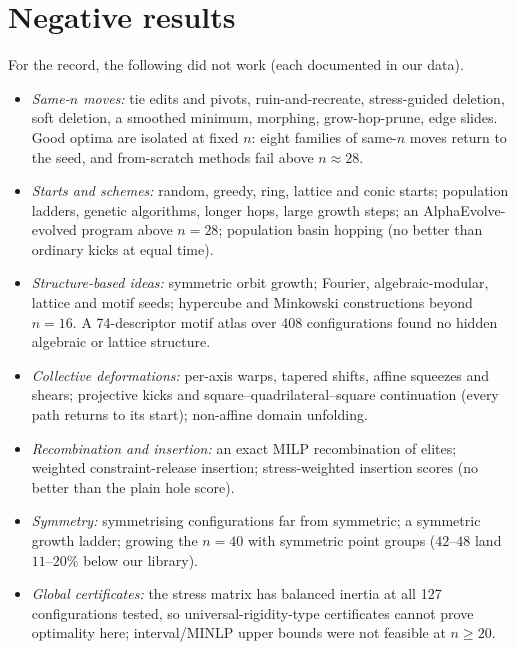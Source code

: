 \documentclass[11pt]{amsart}
\theoremstyle{definition}
\begin{document}
\section{Negative results}\label{sec:negative}
For the record, the following did not work (each documented in our data).
\begin{itemize}
\item \emph{Same-$n$ moves:} tie edits and pivots, ruin-and-recreate, stress-guided deletion, soft deletion, a smoothed minimum, morphing, grow-hop-prune, edge slides. Good optima are isolated at fixed $n$: eight families of same-$n$ moves return to the seed, and from-scratch methods fail above $n \approx 28$. %
\item \emph{Starts and schemes:} random, greedy, ring, lattice and conic starts; population ladders, genetic algorithms, longer hops, large growth steps; an AlphaEvolve-evolved program above $n = 28$; population basin hopping (no better than ordinary kicks at equal time). %
\item \emph{Structure-based ideas:} symmetric orbit growth; Fourier, algebraic-modular, lattice and motif seeds; hypercube and Minkowski constructions beyond $n = 16$. A 74-descriptor motif atlas over 408 configurations found no hidden algebraic or lattice structure. %
\item \emph{Collective deformations:} per-axis warps, tapered shifts, affine squeezes and shears; projective kicks and square--quadrilateral--square continuation (every path returns to its start); non-affine domain unfolding. %
\item \emph{Recombination and insertion:} an exact MILP recombination of elites; weighted constraint-release insertion; stress-weighted insertion scores (no better than the plain hole score). %
\item \emph{Symmetry:} symmetrising configurations far from symmetric; a symmetric growth ladder; growing the $n = 40$ with symmetric point groups ($42$--$48$ land $11$--$20\%$ below our library). %
\item \emph{Global certificates:} the stress matrix has balanced inertia at all 127 configurations tested, so universal-rigidity-type certificates cannot prove optimality here; interval/MINLP upper bounds were not feasible at $n \ge 20$. %
\end{itemize}
\end{document}
